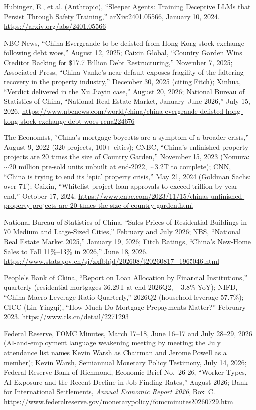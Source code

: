 \documentclass[11pt,a4paper]{article}
\begin{document}
\noindent [117] Hubinger, E., et al. (Anthropic), ``Sleeper Agents: Training Deceptive LLMs that Persist Through Safety Training,'' arXiv:2401.05566, January 10, 2024. \url{https://arxiv.org/abs/2401.05566}

\noindent [118] NBC News, ``China Evergrande to be delisted from Hong Kong stock exchange following debt woes,'' August 12, 2025; Caixin Global, ``Country Garden Wins Creditor Backing for \$17.7 Billion Debt Restructuring,'' November 7, 2025; Associated Press, ``China Vanke's near-default exposes fragility of the faltering recovery in the property industry,'' December 30, 2025 (citing Fitch); Xinhua, ``Verdict delivered in the Xu Jiayin case,'' August 20, 2026; National Bureau of Statistics of China, ``National Real Estate Market, January--June 2026,'' July 15, 2026. \url{https://www.nbcnews.com/world/china/china-evergrande-delisted-hong-kong-stock-exchange-debt-woes-rcna224676}

\noindent [119] The Economist, ``China's mortgage boycotts are a symptom of a broader crisis,'' August 9, 2022 (320 projects, 100+ cities); CNBC, ``China's unfinished property projects are 20 times the size of Country Garden,'' November 15, 2023 (Nomura: $\sim$20 million pre-sold units unbuilt at end-2022, $\sim$\textyen3.2T to complete); CNN, ``China is trying to end its `epic' property crisis,'' May 21, 2024 (Goldman Sachs: over \textyen7T); Caixin, ``Whitelist project loan approvals to exceed  trillion by year-end,'' October 17, 2024. \url{https://www.cnbc.com/2023/11/15/chinas-unfinished-property-projects-are-20-times-the-size-of-country-garden.html}

\noindent [120] National Bureau of Statistics of China, ``Sales Prices of Residential Buildings in 70 Medium and Large-Sized Cities,'' February and July 2026; NBS, ``National Real Estate Market 2025,'' January 19, 2026; Fitch Ratings, ``China's New-Home Sales to Fall 11\%--13\% in 2026,'' June 18, 2026. \url{https://www.stats.gov.cn/sj/zxfbhjd/202608/t20260817_1965046.html}

\noindent [121] People's Bank of China, ``Report on Loan Allocation by Financial Institutions,'' quarterly (residential mortgages \textyen36.29T at end-2026Q2, $-$3.8\% YoY); NIFD, ``China Macro Leverage Ratio Quarterly,'' 2026Q2 (household leverage 57.7\%); CICC (Lin Yingqi), ``How Much Do Mortgage Prepayments Matter?'' February 2023. \url{https://www.cls.cn/detail/2271293}

\noindent [122] Federal Reserve, FOMC Minutes, March 17--18, June 16--17 and July 28--29, 2026 (AI-and-employment language weakening meeting by meeting; the July attendance list names Kevin Warsh as Chairman and Jerome Powell as a member); Kevin Warsh, Semiannual Monetary Policy Testimony, July 14, 2026; Federal Reserve Bank of Richmond, Economic Brief No.~26-26, ``Worker Types, AI Exposure and the Recent Decline in Job-Finding Rates,'' August 2026; Bank for International Settlements, \textit{Annual Economic Report 2026}, Box~C. \url{https://www.federalreserve.gov/monetarypolicy/fomcminutes20260729.htm}
\end{document}
